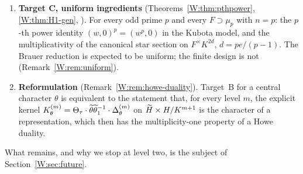 \begin{enumerate}[leftmargin=*]
of $K^1/K^2$ at level $\le1$, and two of dimension $81$ for the
six-dimensional representations of level two, where the proof rests on
Lemma~\ref{W:lem:Hstructure} and on the freeness of the twisted action of
$Q_1/Q_3$ on the genuine characters of $\hat H$
(Proposition~\ref{W:prop:free}).  Levels $\ge3$ are open
(Sections~\ref{W:subsec:cuberoot}, \ref{W:sec:future}).
\item \textbf{Target C, uniform ingredients}
(Theorems~\ref{W:thm:pthpower}, \ref{W:thm:H1-gen}, \Ptag).  For every odd
prime $p$ and every $F\supset\mu_p$ with $n=p$: the $p$-th power identity
$(w,0)^p=(w^p,0)$ in the Kubota model, and the multiplicativity of the
canonical star section on $F^\times K^{2d}$, $d=pe/(p-1)$.  The Brauer
reduction is expected to be uniform; the finite design is not
(Remark~\ref{W:rem:uniform}).
\item \textbf{Reformulation} (Remark~\ref{W:rem:howe-duality}).  Target~B
for a central character $\theta$ is equivalent to the statement that,
for every level $m$, the explicit kernel
$K^{(m)}_\theta=\Theta_\tau\cdot\widetilde\theta\widetilde\theta_1^{-1}\cdot\Delta^{(m)}_\theta$ on
$\widetilde H\times H/K^{m+1}$ is the character of a representation, which then
has the multiplicity-one property of a Howe duality.
\end{enumerate}
What remains, and why we stop at level two, is the subject of
Section~\ref{W:sec:future}.
\endgroup
